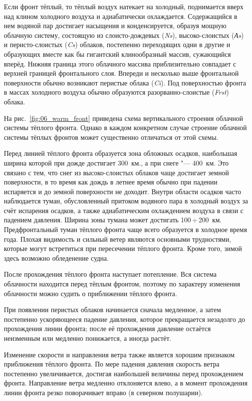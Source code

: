 \documentclass[a4paper, 12pt, twoside, draft, book, russian, fittopage, cyremdash, openright]{ncc}
\newcommand{\otdo}{\,\ensuremath{\div}\,}
\begin{document}
Если фронт тёплый, то тёплый воздух натекает на холодный, поднимается
вверх над клином холодного воздуха и адиабатически
охлаждается. Содержащийся в нем водяной пар достигает насыщения и
конденсируется, образуя мощную облачную систему, состоящую из
слоисто-дождевых (\textit{Ns}), высоко-слоистых (\textit{Аs}) и
перисто-слоистых (\textit{Cs}) облаков, постепенно переходящих одни в
другие и образующих вместе как бы гигантский клинообразный массив,
сужающийся вперёд. Нижняя граница этого облачного массива
приблизительно совпадает с верхней границей фронтального слоя. Впереди
и несколько выше фронтальной поверхности обычно возникают перистые
облака (\textit{Ci}). Под поверхностью фронта в массах холодного
воздуха обычно образуются разорванно-слоистые (\textit{Frst}) облака.

На рис.~\ref{fig:06_warm_front} приведена схема вертикального строения
облачной системы тёплого фронта. Однако в каждом конкретном случае
строение облачной системы тёплых фронтов может существенно отличаться
от этой схемы.

Перед линией тёплого фронта образуется зона обложных
осадков, наибольшая ширина которой при
дожде достигает 300~км., а при снеге "--- 400~км. Это связано с тем,
что снег из высоко-слоистых облаков чаще достигает земной поверхности,
в то время как дождь в летнее время обычно при падении испаряется и до
земной поверхности не доходит. Внутри области осадков часто
наблюдается туман, обусловленный притоком водяного пара в холодный
воздух за счёт испарения осадков, а также адиабатическим охлаждением
воздуха в связи с падением давления. Ширина зоны тумана может
достигать 100\otdo200~км. Предфронтальный туман тёплого фронта чаще
всего образуется в холодное время года. Плохая видимость и сильный
ветер являются основными трудностями, которые могут встретиться при
пересечении тёплого фронта. Кроме того, зимой здесь возможно
обледенение судна.

После прохождения тёплого фронта наступает потепление. Вся система
облачности находится перед тёплым фронтом, поэтому по характеру
изменения облачности можно судить о приближении тёплого фронта.

При появлении перистых облаков начинается сначала медленное, а затем
постепенно ускоряющееся падение давления, которое прекращается
незадолго до прохождения линии фронта; после её прохождения давление
остаётся неизменным или медленно понижается, а иногда растёт.

Изменение скорости и направления ветра также является хорошим
признаком приближения тёплого фронта. По мере падения давления
скорость ветра постепенно увеличивается, достигая наибольшей величины
перед прохождением фронта. Направление ветра медленно отклоняется
влево, а в момент прохождения линии фронта резко поворачивает вправо
(в северном полушарии).
\end{document}
